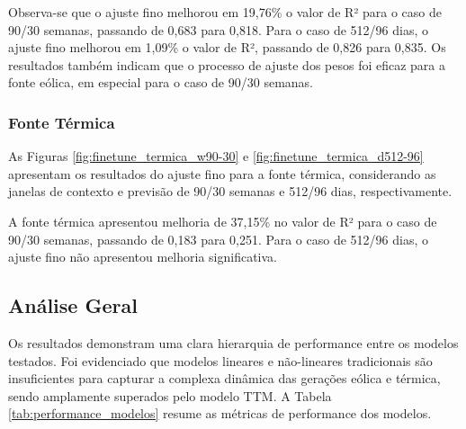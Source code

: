 Observa-se que o ajuste fino melhorou em 19,76\% o valor de R² para o caso de 90/30 semanas, passando de 0,683 para 0,818.
Para o caso de 512/96 dias, o ajuste fino melhorou em 1,09\% o valor de R², passando de 0,826 para 0,835. Os resultados
também indicam que o processo de ajuste dos pesos foi eficaz para a fonte eólica, em especial para o caso de 90/30 semanas.

\subsubsection{Fonte Térmica}
\begin{figure}[!ht]
  {}
  {}
\end{figure}
\begin{figure}[!ht]
  {}
  {}
\end{figure}
As Figuras \ref{fig:finetune_termica_w90-30} e \ref{fig:finetune_termica_d512-96} apresentam os resultados do ajuste fino
para a fonte térmica, considerando as janelas de contexto e previsão de 90/30 semanas e 512/96 dias, respectivamente.

A fonte térmica apresentou melhoria de 37,15\% no valor de R² para o caso de 90/30 semanas, passando de 0,183 para 0,251.
Para o caso de 512/96 dias, o ajuste fino não apresentou melhoria significativa. 

\subsection{Análise Geral}
Os resultados demonstram uma clara hierarquia de performance entre os modelos testados. Foi evidenciado que modelos 
lineares e não-lineares tradicionais são insuficientes para capturar a complexa dinâmica das gerações eólica e térmica, sendo 
amplamente superados pelo modelo TTM. A Tabela \ref{tab:performance_modelos} resume as métricas de performance dos modelos.

